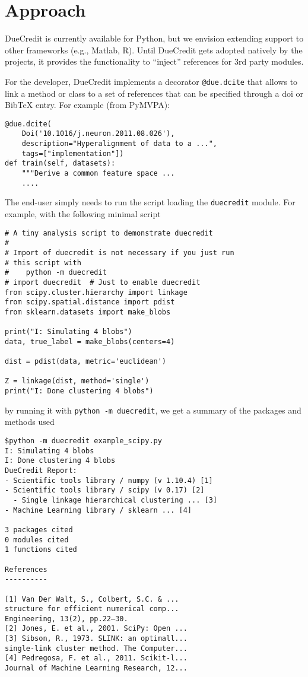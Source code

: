 \documentclass[twocolumn]{bmcart}%
\begin{document}
\section{Approach}\label{approach}

DueCredit is currently available for Python, but we envision extending
support to other frameworks (e.g., Matlab, R). Until DueCredit gets
adopted natively by the projects, it provides the functionality to
``inject'' references for 3rd party modules.

For the developer, DueCredit implements a decorator \texttt{@due.dcite}
that allows to link a method or class to a set of references that can be
specified through a doi or BibTeX entry. For example (from PyMVPA):

\begin{verbatim}
@due.dcite(
    Doi('10.1016/j.neuron.2011.08.026'),
    description="Hyperalignment of data to a ...",
    tags=["implementation"])
def train(self, datasets):
    """Derive a common feature space ...
    ....
\end{verbatim}

The end-user simply needs to run the script loading the
\texttt{duecredit} module. For example, with the following minimal
script

\begin{verbatim}
# A tiny analysis script to demonstrate duecredit
#
# Import of duecredit is not necessary if you just run
# this script with
#    python -m duecredit
# import duecredit  # Just to enable duecredit
from scipy.cluster.hierarchy import linkage
from scipy.spatial.distance import pdist
from sklearn.datasets import make_blobs

print("I: Simulating 4 blobs")
data, true_label = make_blobs(centers=4)

dist = pdist(data, metric='euclidean')

Z = linkage(dist, method='single')
print("I: Done clustering 4 blobs")
\end{verbatim}

by running it with \texttt{python\ -m\ duecredit}, we get a summary of
the packages and methods used

\begin{verbatim}
$python -m duecredit example_scipy.py
I: Simulating 4 blobs
I: Done clustering 4 blobs
DueCredit Report:
- Scientific tools library / numpy (v 1.10.4) [1]
- Scientific tools library / scipy (v 0.17) [2]
  - Single linkage hierarchical clustering ... [3]
- Machine Learning library / sklearn ... [4]

3 packages cited
0 modules cited
1 functions cited

References
----------

[1] Van Der Walt, S., Colbert, S.C. & ...
structure for efficient numerical comp...
Engineering, 13(2), pp.22–30.
[2] Jones, E. et al., 2001. SciPy: Open ...
[3] Sibson, R., 1973. SLINK: an optimall...
single-link cluster method. The Computer...
[4] Pedregosa, F. et al., 2011. Scikit-l...
Journal of Machine Learning Research, 12...
\end{verbatim}
\end{document}
